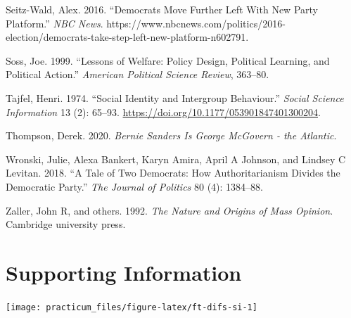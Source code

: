 \documentclass[
]{article}
\newlength{\cslhangindent}
\newenvironment{CSLReferences}[2] %
 {%
  \setlength{\parindent}{0pt}
  \ifodd #1 \everypar{\setlength{\hangindent}{\cslhangindent}}\ignorespaces\fi
  \ifnum #2 > 0
  \setlength{\parskip}{#2\baselineskip}
  \fi
 }%
 {}
\begin{document}
\begin{CSLReferences}{1}{0}
\leavevmode{}%
Seitz-Wald, Alex. 2016. {``Democrats {Move Further Left With New Party Platform}.''} \emph{NBC News}. https://www.nbcnews.com/politics/2016-election/democrats-take-step-left-new-platform-n602791.

\leavevmode{}%
Soss, Joe. 1999. {``Lessons of Welfare: Policy Design, Political Learning, and Political Action.''} \emph{American Political Science Review}, 363--80.

\leavevmode{}%
Tajfel, Henri. 1974. {``Social Identity and Intergroup Behaviour.''} \emph{Social Science Information} 13 (2): 65--93. \url{https://doi.org/10.1177/053901847401300204}.

\leavevmode{}%
Thompson, Derek. 2020. \emph{Bernie Sanders Is George {McGovern} - the Atlantic}.

\leavevmode{}%
Wronski, Julie, Alexa Bankert, Karyn Amira, April A Johnson, and Lindsey C Levitan. 2018. {``A Tale of Two Democrats: How Authoritarianism Divides the Democratic Party.''} \emph{The Journal of Politics} 80 (4): 1384--88.

\leavevmode{}%
Zaller, John R, and others. 1992. \emph{The Nature and Origins of Mass Opinion}. {Cambridge university press}.

\end{CSLReferences}

\hypertarget{appendix-appendix}{%
\appendix}


\clearpage

\hypertarget{supporting-information}{%
\section{Supporting Information}\label{supporting-information}}

\begin{center}\texttt{[image: practicum\_files/figure-latex/ft-difs-si-1]} \end{center}
\end{document}
